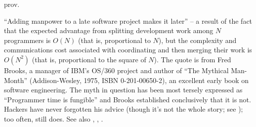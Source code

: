 prov.

``Adding manpower to a late software project makes it later'' -- a result of the
fact that the expected advantage from splitting development work among $N$
programmers is $O\left(N\right)$ (that is, proportional to $N$), but the
complexity and communications cost associated with coordinating and then merging
their work is $O\left(N^2\right)$ (that is, proportional to the square of $N$).
The quote is from Fred Brooks, a manager of IBM's OS/360 project and author of
``The Mythical Man-Month'' (Addison-Wesley, 1975, ISBN 0-201-00650-2), an
excellent early book on software engineering. The myth in question has been most
tersely expressed as ``Programmer time is fungible'' and Brooks established
conclusively that it is not. Hackers have never forgotten his advice (though
it's not the whole story; see ); too often,
 still does. See also ,
, .

